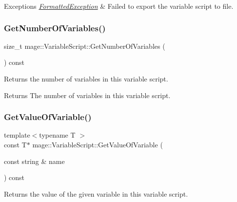 \begin{DoxyExceptions}{Exceptions}
{\em \hyperlink{structmage_1_1_formatted_exception}{Formatted\+Exception}} & Failed to export the variable script to file. \\
\hline
\end{DoxyExceptions}
\hypertarget{classmage_1_1_variable_script_ad0bcb7dbb42f705f475c64feb1063fb4}{}\label{classmage_1_1_variable_script_ad0bcb7dbb42f705f475c64feb1063fb4} 
\subsubsection{\texorpdfstring{Get\+Number\+Of\+Variables()}{GetNumberOfVariables()}}
{\footnotesize\ttfamily size\+\_\+t mage\+::\+Variable\+Script\+::\+Get\+Number\+Of\+Variables (\begin{DoxyParamCaption}{ }\end{DoxyParamCaption}) const}

Returns the number of variables in this variable script.

\begin{DoxyReturn}{Returns}
The number of variables in this variable script. 
\end{DoxyReturn}
\hypertarget{classmage_1_1_variable_script_a231b83e1e32b882489ed90faa69f7137}{}\label{classmage_1_1_variable_script_a231b83e1e32b882489ed90faa69f7137} 
\subsubsection{\texorpdfstring{Get\+Value\+Of\+Variable()}{GetValueOfVariable()}}
{\footnotesize\ttfamily template$<$typename T $>$ \\
const T$\ast$ mage\+::\+Variable\+Script\+::\+Get\+Value\+Of\+Variable (\begin{DoxyParamCaption}\item[{const string \&}]{name }\end{DoxyParamCaption}) const}

Returns the value of the given variable in this variable script.


